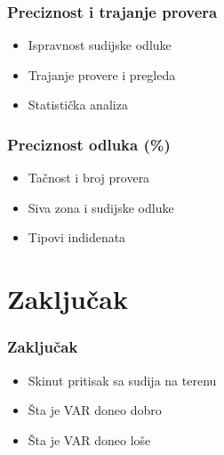 \documentclass{beamer}
\begin{document}
\begin{frame}
  \frametitle{Preciznost i trajanje provera}
  \begin{itemize}
    \item  Ispravnost sudijske odluke
    \item  Trajanje provere i pregleda
    \item  Statistička analiza
  \end{itemize}
\end{frame}

\begin{frame}
  \frametitle{Preciznost odluka (\%)}
  \begin{itemize}
    \item  Tačnost i broj provera
    \item  Siva zona i sudijske odluke
    \item  Tipovi indidenata
  \end{itemize}
\end{frame}

\section{Zaključak}

\begin{frame}
  \frametitle{Zaključak}
  \begin{itemize}
    \item  Skinut pritisak sa sudija na terenu
    \item  Šta je VAR doneo dobro
    \item  Šta je VAR doneo loše
  \end{itemize}
\end{frame}
\end{document}
